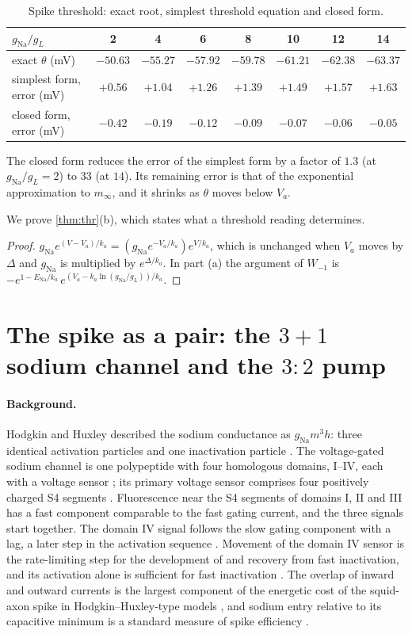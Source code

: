 \documentclass[11pt]{article}
\theoremstyle{definition}\newtheorem{definition}[theorem]{Definition}
\theoremstyle{remark}\newtheorem{remark}[theorem]{Remark}
\begin{document}
\begin{table}[htbp]\centering\small
\caption{Spike threshold: exact root, simplest threshold equation and closed form.}\label{tab:thr}
\begin{tabular}{@{}lccccccc@{}}\toprule
$g_\mathrm{Na}/g_L$ & 2 & 4 & 6 & 8 & 10 & 12 & 14\\\midrule
exact $\theta$ (mV) & $-50.63$ & $-55.27$ & $-57.92$ & $-59.78$ & $-61.21$ & $-62.38$ & $-63.37$\\
simplest form, error (mV) & $+0.56$ & $+1.04$ & $+1.26$ & $+1.39$ & $+1.49$ & $+1.57$ & $+1.63$\\
closed form, error (mV) & $-0.42$ & $-0.19$ & $-0.12$ & $-0.09$ & $-0.07$ & $-0.06$ & $-0.05$\\\bottomrule
\end{tabular}
\end{table}

The closed form reduces the error of the simplest form by a factor of $1.3$ (at $g_\mathrm{Na}/g_L=2$) to $33$ (at $14$). Its remaining error is that of the exponential approximation to $m_\infty$, and it shrinks as $\theta$ moves below $V_a$.

We prove \cref{thm:thr}(b), which states what a threshold reading determines.
\begin{proof}
$g_\mathrm{Na}e^{(V-V_a)/k_a}=(g_\mathrm{Na}e^{-V_a/k_a})e^{V/k_a}$, which is unchanged when $V_a$ moves by $\Delta$ and $g_\mathrm{Na}$ is multiplied by $e^{\Delta/k_a}$. In part (a) the argument of $W_{-1}$ is $-e^{1-E_\mathrm{Na}/k_a}\,e^{(V_a-k_a\ln(g_\mathrm{Na}/g_L))/k_a}$.
\end{proof}

\section{The spike as a pair: the \texorpdfstring{$3+1$}{3+1} sodium channel and the \texorpdfstring{$3{:}2$}{3:2} pump}\label{sec:na}
\paragraph{Background.} Hodgkin and Huxley described the sodium conductance as $g_{\mathrm{Na}}m^3h$: three identical activation particles and one inactivation particle \cite{HH}. The voltage-gated sodium channel is one polypeptide with four homologous domains, I--IV, each with a voltage sensor \cite{Hille}; its primary voltage sensor comprises four positively charged S4 segments \cite{ChandaBezanilla}. Fluorescence near the S4 segments of domains I, II and III has a fast component comparable to the fast gating current, and the three signals start together. The domain IV signal follows the slow gating component with a lag, a later step in the activation sequence \cite{ChandaBezanilla}. Movement of the domain IV sensor is the rate-limiting step for the development of and recovery from fast inactivation, and its activation alone is sufficient for fast inactivation \cite{Capes}. The overlap of inward and outward currents is the largest component of the energetic cost of the squid-axon spike in Hodgkin--Huxley-type models \cite{Crotty}, and sodium entry relative to its capacitive minimum is a standard measure of spike efficiency \cite{Alle}.
\end{document}
